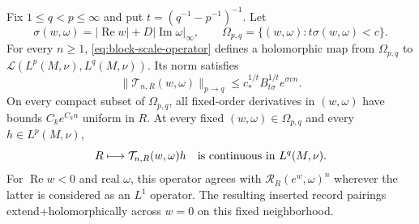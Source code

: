\begin{theorem}
\label{thm:common-scale-holomorphy}
Fix $1\le q<p\le\infty$ and put $t=(q^{-1}-p^{-1})^{-1}$. Let
\[
 \sigma(w,\omega)=|\operatorname{Re}w|+D|\operatorname{Im}\omega|_\infty,
 \qquad \Omega_{p,q}=\{(w,\omega):t\sigma(w,\omega)<c\}.
\]
For every $n\ge1$, \eqref{eq:block-scale-operator} defines a
holomorphic map from $\Omega_{p,q}$ to
$\mathcal L(L^p(M,\nu),L^q(M,\nu))$. Its norm satisfies
\begin{equation}\label{eq:scale-operator-bound}
 \|\mathcal T_{n,R}(w,\omega)\|_{p\to q}
       \le c_*^{1/t}B_{t\sigma}^{1/t}e^{\sigma vn}.
\end{equation}
On every compact subset of $\Omega_{p,q}$, all fixed-order derivatives in $(w,\omega)$ have bounds $C_k e^{C_k n}$ uniform in $R$. At every fixed
$(w,\omega)\in\Omega_{p,q}$ and every $h\in L^p(M,\nu)$,
\begin{equation}\label{eq:scale-parameter-continuity}
 R\longmapsto\mathcal T_{n,R}(w,\omega)h
       \quad\hbox{is continuous in }L^q(M,\nu).
\end{equation}
For $\operatorname{Re}w<0$ and real $\omega$, this operator agrees
with $\mathcal R_R(e^w,\omega)^n$ wherever the latter is considered
as an $L^1$ operator. The resulting inserted record pairings extend+holomorphically across $w=0$ on this fixed neighborhood.
\end{theorem}

